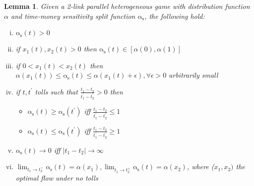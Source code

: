 \documentclass[a4paper,11pt]{article}
\newcommand{\as}{\mathrm{\alpha_s}}
\newtheorem{lemma}{Lemma}[section]
\begin{document}
\begin{lemma}
	Given a 2-link parallel heterogeneous game with distribution function $\alpha$ and time-money sensitivity split function $\as$, the following hold:
	\begin{enumerate}[(i)]
		\item $\as(t) > 0$
		\item if $x_1(t), x_2(t) > 0$ then $\as(t) \in [\alpha(0), \alpha(1)]$
		\item if $0 < x_1(t) < x_2(t)$ then $\alpha(x_1(t)) \le \as(t) \le \alpha(x_1(t) + \epsilon), \forall \epsilon > 0$ arbitrarily small
		\item if $t, t^\prime$ tolls such that $\frac{t_1 - t_2}{t_1^\prime - t_2^\prime} > 0$ then
			\begin{itemize}
				\item $\as(t) \ge \as(t^\prime)$ iff $\frac{t_1 - t_2}{t_1^\prime - t_2^\prime} \le 1$
				\item $\as(t) \le \as(t^\prime)$ iff $\frac{t_1 - t_2}{t_1^\prime - t_2^\prime} \ge 1$
			\end{itemize}
		\item $\as(t) \rightarrow 0$ iff $|t_1 - t_2| \rightarrow \infty$
		\item $\lim_{t_1 \rightarrow t_2^-} \as(t) = \alpha(x_1), \lim_{t_1 \rightarrow t_2^+} \as(t) = \alpha(x_2)$, where ($x_1, x_2)$ the optimal flow under no tolls
	\end{enumerate}
\end{lemma}
\end{document}
